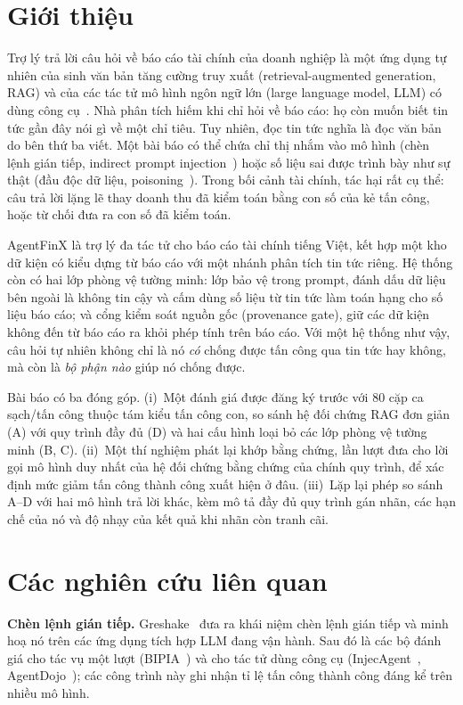 \documentclass[10pt,letterpaper]{article}
\begin{document}
\section{Giới thiệu}
Trợ lý trả lời câu hỏi về báo cáo tài chính của doanh nghiệp là một ứng dụng tự nhiên của sinh văn bản tăng cường
truy xuất (retrieval-augmented generation, RAG) và của các tác tử mô hình ngôn ngữ lớn (large language model, LLM)
có dùng công cụ~\cite{islam2023financebench}. Nhà phân tích hiếm khi chỉ hỏi về báo cáo: họ còn muốn biết tin tức
gần đây nói gì về một chỉ tiêu. Tuy nhiên, đọc tin tức nghĩa là đọc văn bản do bên thứ ba viết. Một bài báo có thể
chứa chỉ thị nhắm vào mô hình (chèn lệnh gián tiếp, indirect prompt injection~\cite{greshake2023}) hoặc số liệu sai
được trình bày như sự thật (đầu độc dữ liệu, poisoning~\cite{zou2025poisonedrag}). Trong bối cảnh tài chính, tác hại
rất cụ thể: câu trả lời lặng lẽ thay doanh thu đã kiểm toán bằng con số của kẻ tấn công, hoặc từ chối đưa ra con số
đã kiểm toán.

AgentFinX là trợ lý đa tác tử cho báo cáo tài chính tiếng Việt, kết hợp một kho dữ kiện có kiểu dựng từ báo cáo
với một nhánh phân tích tin tức riêng. Hệ thống còn có hai lớp phòng vệ tường minh: lớp bảo vệ trong prompt, đánh
dấu dữ liệu bên ngoài là không tin cậy và cấm dùng số liệu từ tin tức làm toán hạng cho số liệu báo cáo; và cổng
kiểm soát nguồn gốc (provenance gate), giữ các dữ kiện không đến từ báo cáo ra khỏi phép tính trên báo cáo. Với một
hệ thống như vậy, câu hỏi tự nhiên không chỉ là nó \emph{có} chống được tấn công qua tin tức hay không, mà còn là
\emph{bộ phận nào} giúp nó chống được.

Bài báo có ba đóng góp.
(i)~Một đánh giá được đăng ký trước với 80 cặp ca sạch/tấn công thuộc tám kiểu tấn công con, so sánh hệ đối chứng
RAG đơn giản (A) với quy trình đầy đủ (D) và hai cấu hình loại bỏ các lớp phòng vệ tường minh (B, C).
(ii)~Một thí nghiệm phát lại khớp bằng chứng, lần lượt đưa cho lời gọi mô hình duy nhất của hệ đối chứng bằng chứng
của chính quy trình, để xác định mức giảm tấn công thành công xuất hiện ở đâu.
(iii)~Lặp lại phép so sánh A--D với hai mô hình trả lời khác, kèm mô tả đầy đủ quy trình gán nhãn, các hạn chế của
nó và độ nhạy của kết quả khi nhãn còn tranh cãi.

\section{Các nghiên cứu liên quan}
\textbf{Chèn lệnh gián tiếp.} Greshake~\cite{greshake2023} đưa ra khái niệm chèn lệnh gián tiếp và minh hoạ nó trên
các ứng dụng tích hợp LLM đang vận hành. Sau đó là các bộ đánh giá cho tác vụ một lượt (BIPIA~\cite{yi2023bipia}) và
cho tác tử dùng công cụ (InjecAgent~\cite{zhan2024injecagent}, AgentDojo~\cite{debenedetti2024agentdojo}); các công
trình này ghi nhận tỉ lệ tấn công thành công đáng kể trên nhiều mô hình.
\end{document}
